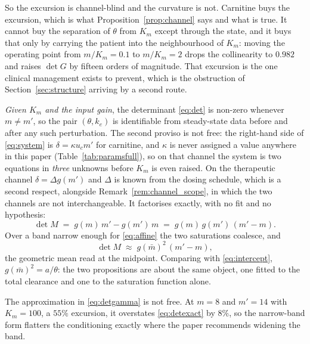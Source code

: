 \begin{remark}
So the excursion is channel-blind and the curvature is not. Carnitine buys the
excursion, which is what Proposition~\ref{prop:channel} says and what is true. It cannot buy
the separation of $\theta$ from $K_m$ except through the state, and it buys that only by
carrying the patient into the neighbourhood of $K_m$: moving the operating point from
$m/K_m = 0.1$ to $m/K_m = 2$ drops the collinearity to $0.982$ and raises $\det G$ by
fifteen orders of magnitude. That excursion is the one clinical management exists to
prevent, which is the obstruction of Section~\ref{sec:structure} arriving by a second route.
\end{remark}

\begin{proposition}
\label{prop:illcond}
\emph{Given $K_m$ and the input gain}, the determinant \eqref{eq:det} is non-zero whenever
$m \neq m'$, so the pair $(\theta, k_e)$ is identifiable from steady-state data before and
after any such perturbation. The second proviso is not free: the right-hand side of \eqref{eq:system} is $\delta = \kappa u_c m'$ for carnitine,
and $\kappa$ is never assigned a value anywhere in this paper (Table~\ref{tab:paramsfull}), so on
that channel the system is two equations in \emph{three} unknowns before $K_m$ is even
raised. On the therapeutic channel $\delta = \Delta g(m')$ and $\Delta$ is known from the
dosing schedule, which is a second respect, alongside
Remark~\ref{rem:channel_scope}, in which the two channels are not interchangeable. It factorises exactly, with no fit and no hypothesis:
\begin{equation}
\det M \;=\; g(m)\,m' - g(m')\,m \;=\; g(m)\,g(m')\,(m' - m).
\label{eq:detexact}
\end{equation}
Over a band narrow enough for \eqref{eq:affine} the two saturations coalesce, and
\begin{equation}
\det M \;\approx\; g(\bar m)^2\,(m' - m),
\label{eq:detgamma}
\end{equation}
the geometric mean read at the midpoint. Comparing with \eqref{eq:intercept},
$g(\bar m)^2 = a/\theta$: the two propositions are about the same object, one fitted to the
total clearance and one to the saturation function alone.
\end{proposition}

The approximation in \eqref{eq:detgamma} is not free. At $m = 8$ and $m' = 14$ with
$K_m = 100$, a $55\%$ excursion, it overstates \eqref{eq:detexact} by $8\%$, so the
narrow-band form flatters the conditioning exactly where the paper recommends widening the
band.

